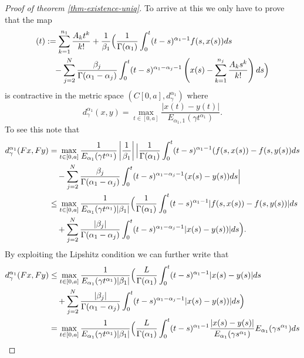 \begin{proof}[Proof of theorem \ref{thm-existence-uniq}]

	To arrive at this we only have to prove that the map
	\begin{align}
		[Fx](t) &:= \sum_{k=1}^{n_1}\frac{A_kt^k}{k!} + \frac{1}{\beta_1} \Bigl( \frac{1}{\Gamma(\alpha_1)}\int_{0}^{t} (t-s)^{\alpha_1 - 1}f(s,x(s))ds \\
			& \ \ \ - \sum_{j=2}^{N} \frac{\beta_j}{\Gamma(\alpha_1 - \alpha_j)}\int_{0}^{t}(t-s)^{\alpha_1 - \alpha_j - 1}\left(x(s) - \sum_{k=1}^{n_j}\frac{A_ks^k}{k!} \right) ds \Bigr)
	\end{align}
	is contractive in the metric space $ \left( C[0,a], d^{\alpha_1}_\gamma \right) $ where 
	$$ d_\gamma^{\alpha_1}(x,y) = \max_{t \in [0, a]} \frac{|x(t) - y(t)|}{E_{\alpha_1,1}(\gamma t^{\alpha_1})}. $$
	To see this note that
	\begin{align}
		d_\gamma^{\alpha_1}(Fx,Fy) &= \max_{t \in [0, a]}  \frac{1}{E_{\alpha_1}(\gamma t^{\alpha_1})} 
			\left| \frac{1}{\beta_1} \right| \Bigl| \frac{1}{\Gamma(\alpha_1)}\int_0^t (t-s)^{\alpha_1 - 1} (f(s,x(s)) - f(s,y(s))ds \\ 
			& \ \ \ - \sum_{j=2}^N \frac{\beta_j}{\Gamma(\alpha_1 - \alpha_j)} \int_0^t (t-s)^{\alpha_1 - \alpha_j - 1}(x(s) - y(s)) ds \Bigr| \\
			&\leq \max_{t \in [0, a]} \frac{1}{E_{\alpha_1}(\gamma t^{\alpha_1}) | \beta_1 |} \Big(
			 \frac{1}{\Gamma(\alpha_1)}\int_0^t (t-s)^{\alpha_1 - 1} |f(s,x(s)) - f(s,y(s))|ds \\ 
			& \ \ \ + \sum_{j=2}^N \frac{|\beta_j|}{\Gamma(\alpha_1 - \alpha_j)} \int_0^t (t-s)^{\alpha_1 - \alpha_j - 1}|x(s) - y(s))| ds \Bigr).
	\end{align}
	By exploiting the Lipshitz condition we can further write that 
	\begin{align}
		d_\gamma^{\alpha_1}(Fx,Fy) &\leq \max_{t \in [0, a]} \frac{1}{E_{\alpha_1}(\gamma t^{\alpha_1})|\beta_1|} \Bigl(
			\frac{L}{\Gamma(\alpha_1)}\int_0^t (t-s)^{\alpha_1 - 1} |x(s) - y(s)|ds \\ 
			& \ \ \ + \sum_{j=2}^N \frac{|\beta_j|}{\Gamma(\alpha_1 - \alpha_j)} \int_0^t (t-s)^{\alpha_1 - \alpha_j - 1}|x(s) - y(s))| ds \Bigr) \\
			&= \max_{t \in [0, a]} \frac{1}{E_{\alpha_1}(\gamma t^{\alpha_1})|\beta_1|} \Bigl(
			\frac{L}{\Gamma(\alpha_1)}\int_0^t (t-s)^{\alpha_1 - 1} \frac{|x(s) - y(s)|}{E_{\alpha_1}(\gamma s^{\alpha_1})}E_{\alpha_1}(\gamma s^{\alpha_1})ds \\ 

\end{align}
\end{proof}
